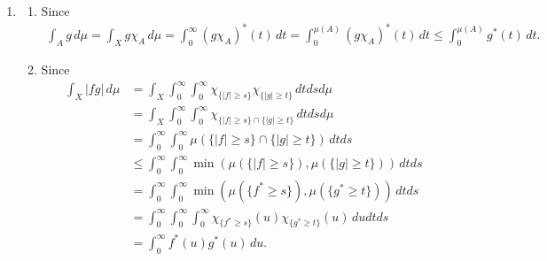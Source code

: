 \begin{enumerate}
\item[1.4.1.]
   \begin{enumerate}
   \item[(a)] Since
   \begin{equation*}\begin{aligned}
   \int_{A}g\,d\mu = \int_{X}g\chi_{A}\,d\mu 
   = \int_{0}^{\infty}(g\chi_{A})^{*}(t)\,dt 
   = \int_{0}^{\mu(A)}(g\chi_{A})^{*}(t)\,dt 
   \leq \int_{0}^{\mu(A)}g^{*}(t)\,dt.
   \end{aligned}\end{equation*}

   \item[(b)] Since
   \begin{equation*}\begin{aligned}
   \int_{X}|fg|\,d\mu
   &= \int_{X}\int_{0}^{\infty}\int_{0}^{\infty}\chi_{\{|f| \geq s\}}\chi_{\{|g| \geq t\}}\,dtdsd\mu 
   \\&= \int_{X}\int_{0}^{\infty}\int_{0}^{\infty}\chi_{\{|f| \geq s \} \cap \{ |g| \geq t\}}\,dtdsd\mu
   \\&= \int_{0}^{\infty}\int_{0}^{\infty}\mu(\{|f| \geq s \} \cap \{ |g| \geq t\})\,dtds 
   \\&\leq \int_{0}^{\infty}\int_{0}^{\infty}\min(\mu(\{|f| \geq s \}),\mu(\{ |g| \geq t\}))\,dtds
   \\&= \int_{0}^{\infty}\int_{0}^{\infty}\min(\mu(\{f^{*} \geq s \}),\mu(\{g^{*} \geq t\}))\,dtds
   \\&= \int_{0}^{\infty}\int_{0}^{\infty}\int_{0}^{\infty}\chi_{\{f^{*} \geq s \}}(u)\chi_{\{g^{*} \geq t\}}(u)\,dudtds
   \\&= \int_{0}^{\infty}f^{*}(u)g^{*}(u)\,du.
   \end{aligned}\end{equation*}
\end{enumerate}


\end{enumerate}
